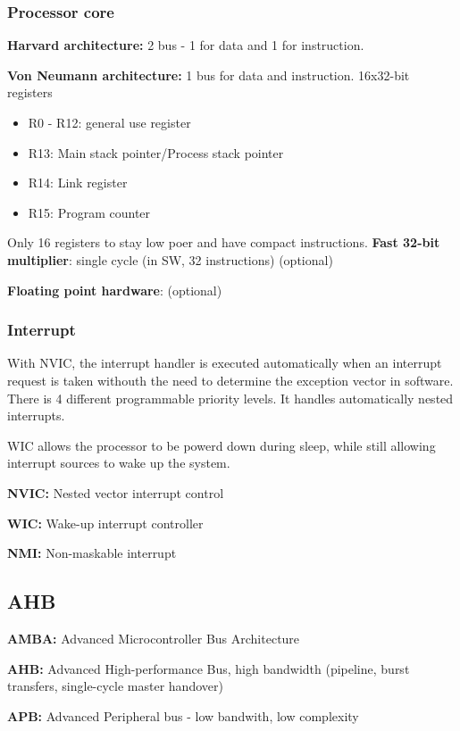 \subsubsection{Processor core}
\textbf{Harvard architecture:} 2 bus - 1 for data and 1 for instruction.

\textbf{Von Neumann architecture:} 1 bus for data and instruction.
\bigbreak
16x32-bit registers
\begin{itemize}
  \item R0 - R12: general use register
  \item R13: Main stack pointer/Process stack pointer
  \item R14: Link register
  \item R15: Program counter
\end{itemize}

Only 16 registers to stay low poer and have compact instructions.
\bigbreak
\textbf{Fast 32-bit multiplier}: single cycle (in SW, 32 instructions) (optional)

\textbf{Floating point hardware}: (optional)


\subsubsection{Interrupt}
With NVIC, the interrupt handler is executed automatically when an interrupt request is taken withouth the need to determine the exception vector in software. There is 4 different programmable priority levels. It handles automatically nested interrupts.

WIC allows the processor to be powerd down during sleep, while still allowing interrupt sources to wake up the system.


\textbf{NVIC:} Nested vector interrupt control

\textbf{WIC:} Wake-up interrupt controller

\textbf{NMI:} Non-maskable interrupt



\subsection{AHB}
\textbf{AMBA:} Advanced Microcontroller Bus Architecture

\textbf{AHB:} Advanced High-performance Bus, high bandwidth (pipeline, burst transfers, single-cycle master handover)

\textbf{APB:} Advanced Peripheral bus - low bandwith, low complexity

